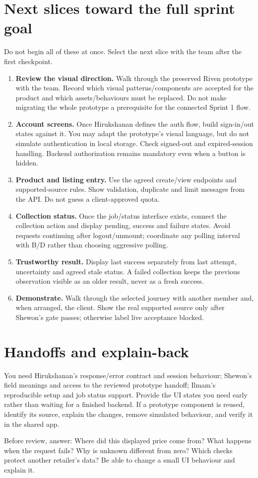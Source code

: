 \section*{Next slices toward the full sprint goal}
Do not begin all of these at once. Select the next slice with the team after the first checkpoint.
\begin{enumerate}
\item \textbf{Review the visual direction.} Walk through the preserved Riven prototype with the team. Record which visual patterns/components are accepted for the product and which assets/behaviours must be replaced. Do not make migrating the whole prototype a prerequisite for the connected Sprint 1 flow.
\item \textbf{Account screens.} Once Hirukshanan defines the auth flow, build sign-in/out states against it. You may adapt the prototype's visual language, but do not simulate authentication in local storage. Check signed-out and expired-session handling. Backend authorization remains mandatory even when a button is hidden.
\item \textbf{Product and listing entry.} Use the agreed create/view endpoints and supported-source rules. Show validation, duplicate and limit messages from the API. Do not guess a client-approved quota.
\item \textbf{Collection status.} Once the job/status interface exists, connect the collection action and display pending, success and failure states. Avoid requests continuing after logout/unmount; coordinate any polling interval with B/D rather than choosing aggressive polling.
\item \textbf{Trustworthy result.} Display last success separately from last attempt, uncertainty and agreed stale status. A failed collection keeps the previous observation visible as an older result, never as a fresh success.
\item \textbf{Demonstrate.} Walk through the selected journey with another member and, when arranged, the client. Show the real supported source only after Shewon's gate passes; otherwise label live acceptance blocked.
\end{enumerate}
\section*{Handoffs and explain-back}
You need Hirukshanan's response/error contract and session behaviour; Shewon's field meanings and access to the reviewed prototype handoff; Ilmam's reproducible setup and job status support. Provide the UI states you need early rather than waiting for a finished backend. If a prototype component is reused, identify its source, explain the changes, remove simulated behaviour, and verify it in the shared app.

Before review, answer: Where did this displayed price come from? What happens when the request fails? Why is unknown different from zero? Which checks protect another retailer's data? Be able to change a small UI behaviour and explain it.
\sharedfinish
